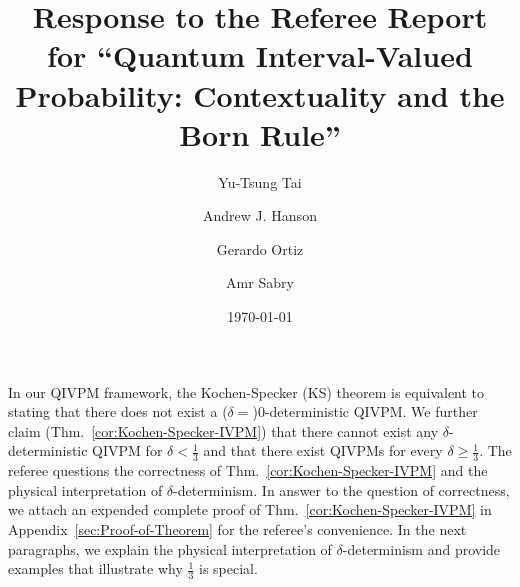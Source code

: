 \documentclass[english,reprint, aps, prl,superscriptaddress, showpacs,
showkeys, longbibliography, amsmath, amssymb, floatfix]{revtex4-1}
\theoremstyle{plain}
\theoremstyle{definition}
\begin{document}
\title{Response to the Referee Report for ``Quantum Interval-Valued Probability:
Contextuality and the Born Rule''}

\author{Yu-Tsung Tai}



\author{Andrew J. Hanson}


\author{Gerardo Ortiz}


\author{Amr Sabry}


\date{\today}

\maketitle

In our QIVPM framework, the Kochen-Specker (KS) theorem is equivalent
to stating that there does not exist a ($\delta=$)$0$-deterministic
QIVPM. We further claim (Thm.~\ref{cor:Kochen-Specker-IVPM}) that there cannot exist any $\delta$-deterministic
QIVPM for $\delta<\frac{1}{3}$ and that there exist QIVPMs for every
$\delta\ge\frac{1}{3}$.
The referee questions the correctness of Thm.~\ref{cor:Kochen-Specker-IVPM}
and the physical interpretation of $\delta$-determinism. In answer
to the question of correctness, we attach an expended complete proof
of Thm.~\ref{cor:Kochen-Specker-IVPM} in Appendix~\ref{sec:Proof-of-Theorem}
for the referee's convenience. In the next paragraphs, we explain
the physical interpretation of $\delta$-determinism and provide examples
that illustrate why $\frac{1}{3}$ is special.
\end{document}
